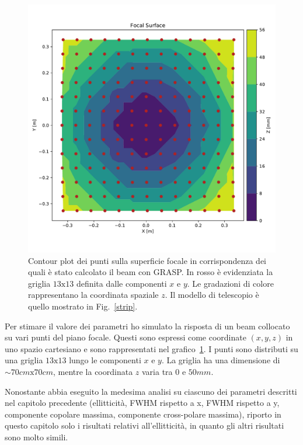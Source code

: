 \documentclass[12pt,a4paper,final]{book}
\begin{document}
\begin{figure}[!ht]
	\centering
	\includegraphics[scale=0.6]{../figures/ContourPlot_z.pdf}
	\caption{Contour plot dei punti sulla superficie focale in corrispondenza dei quali è stato calcolato il beam con GRASP. In rosso è evidenziata la griglia $13\text{x}13$ definita dalle componenti $x$ e $y$. Le gradazioni di colore rappresentano la coordinata spaziale $z$. Il modello di telescopio è quello mostrato in Fig.~\ref{strip}.}
	\label{cplot_fs}
\end{figure}

Per stimare il valore dei parametri ho simulato la risposta di un beam collocato su vari punti del piano focale. Questi sono espressi come coordinate $(x,y,z)$ in uno spazio cartesiano e sono rappresentati nel grafico~\ref{cplot_fs}.
I punti sono distributi su una griglia $13\text{x}13$ lungo le componenti $x$ e $y$. La griglia ha una dimensione di $\sim 70 \unit{cm}\text{x}70 \unit{cm}$, mentre la coordinata $z$ varia tra $0$ e $50 \unit{mm}$.


Nonostante abbia eseguito la medesima analisi su ciascuno dei parametri descritti nel capitolo precedente (ellitticità, FWHM rispetto a x, FWHM rispetto a y, componente copolare massima, componente cross-polare massima), riporto in questo capitolo solo i risultati relativi all'ellitticità, in quanto gli altri risultati sono molto simili.
\end{document}
